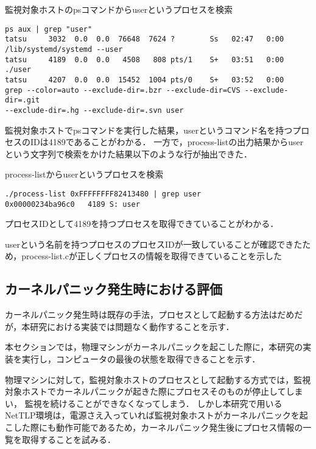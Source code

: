 \begin{itembox}[l]{監視対象ホストのpsコマンドからuserというプロセスを検索}
    \begin{verbatim}
ps aux | grep "user"
tatsu     3032  0.0  0.0  76648  7624 ?        Ss   02:47   0:00
/lib/systemd/systemd --user
tatsu     4189  0.0  0.0   4508   808 pts/1    S+   03:51   0:00 ./user
tatsu     4207  0.0  0.0  15452  1004 pts/0    S+   03:52   0:00
grep --color=auto --exclude-dir=.bzr --exclude-dir=CVS --exclude-dir=.git
--exclude-dir=.hg --exclude-dir=.svn user
    \end{verbatim}
\end{itembox}

監視対象ホストでpsコマンドを実行した結果，userというコマンド名を持つプロセスのIDは4189であることがわかる．
一方で，process-listの出力結果からuserという文字列で検索をかけた結果以下のような行が抽出できた．

\begin{itembox}[l]{process-listからuserというプロセスを検索}
    \begin{verbatim}
./process-list 0xFFFFFFFF82413480 | grep user
0x00000234ba96c0   4189 S: user
    \end{verbatim}
\end{itembox}

プロセスIDとして4189を持つプロセスを取得できていることがわかる．

userという名前を持つプロセスのプロセスIDが一致していることが確認できたため，process-list.cが正しくプロセスの情報を取得できていることを示した

\subsection{カーネルパニック発生時における評価}

カーネルパニック発生時は既存の手法，プロセスとして起動する方法はだめだが，本研究における実装では問題なく動作することを示す．

本セクションでは，物理マシンがカーネルパニックを起こした際に，本研究の実装を実行し，コンピュータの最後の状態を取得できることを示す．

物理マシンに対して，監視対象ホストのプロセスとして起動する方式では，監視対象ホストでカーネルパニックが起きた際にプロセスそのものが停止してしまい，
監視を続けることができなくなってしまう．
しかし本研究で用いるNetTLP環境は，電源さえ入っていれば監視対象ホストがカーネルパニックを起こした際にも動作可能であるため，カーネルパニック発生後にプロセス情報の一覧を取得することを試みる．

